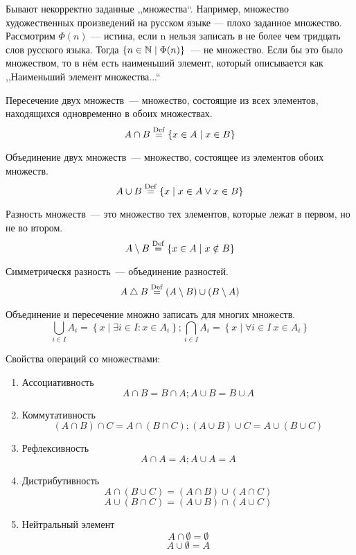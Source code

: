 Бывают некорректно заданные ,,множества``. Например, множество художественных произведений на русском языке --- плохо заданное множество. Рассмотрим 
$\Phi(n)$ --- истина, если n нельзя записать в не более чем тридцать слов русского языка. Тогда
$\left\{n \in \mathbb{N} \mid \Phi(n)\right\}$~--- не множество. Если бы это было множеством, то в нём есть наименьший элемент, 
который описывается как ,,Наименьший элемент множества...``

\begin{Def}
Пересечение двух множеств~--- множество, состоящие из всех элементов, находящихся одновременно в обоих множествах.
$$ A \cap B \stackrel{\mathrm{Def}}{=} \left\{x \in A \mid x \in B \right\} $$
\end{Def}
\begin{Def}
Объединение двух множеств~--- множество, состоящее из элементов обоих множеств.
$$ A \cup B \stackrel{\mathrm{Def}}{=} \left\{x \mid x \in A \lor x \in B \right\} $$
\end{Def}
\begin{Def}
Разность множеств~--- это множество тех элементов, которые лежат в первом, но не во втором.
$$ A \mathbin{\backslash} B \stackrel{\mathrm{Def}}{=} \left\{ x \in A \mid x \notin B \right\}$$
\end{Def}
\begin{Def}
Симметрическя разность~--- объединение разностей.
$$ A \bigtriangleup B \stackrel{\mathrm{Def}}{=} \left(A \mathbin{\backslash} B\right) \cup \left(B \mathbin{\backslash} A\right) $$
\end{Def}

Объединение и пересечение множно записать для многих множеств.
$$ \bigcup_{i \in I} A_i = \left\{x \mid \exists i \in I\colon x \in A_i\right\}; 
\bigcap_{i \in I} A_i = \left\{x \mid \forall i \in I\: x \in A_i \right\} $$

Свойства операций со множествами:
\begin{enumerate}
\item Ассоциативность
$$ A \cap B = B \cap A; A \cup B = B \cup A $$
\item Коммутативность
$$ \left(A \cap B \right) \cap C = A \cap \left(B \cap C \right); \left(A \cup B \right) \cup C = A \cup \left(B \cup C \right) $$
\item Рефлексивность
$$ A \cap A = A; A \cup A = A $$
\item Дистрибутивность
$$ A \cap \left(B \cup C \right) = \left(A \cap B\right) \cup \left(A \cap C \right) $$
$$ A \cup \left(B \cap C \right) = \left(A \cup B\right) \cap \left(A \cup C \right) $$
\item Нейтральный элемент
$$ A \cap \emptyset = \emptyset$$
$$ A \cup \emptyset = A$$
\end{enumerate}

